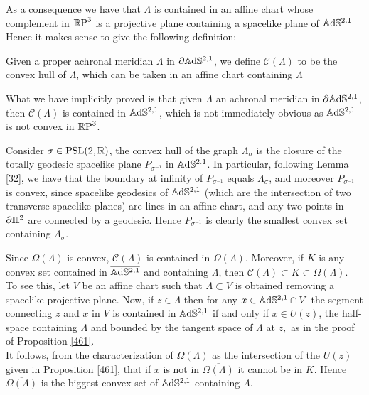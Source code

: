 As a consequence we have that $\Lambda$ is contained in an affine chart whose complement in $\mathbb{R}\text{P}^3$ is a projective plane containing a spacelike plane of $\mathbb{A}\mathrm{d}\mathbb{S}^{2,1}$ Hence it makes sense to give the following definition:

\begin{definition}
    Given a proper achronal meridian $\Lambda$ in $\partial\mathbb{A}\mathrm{d}\mathbb{S}^{2,1}$, we define $\mathcal{C}(\Lambda)$ to be the convex hull of $\Lambda$, which can be taken in an affine chart containing $\Lambda$
\end{definition}

What we have implicitly proved is that given $\Lambda$ an achronal meridian in $\partial\mathbb{A}\mathrm{d}\mathbb{S}^{2,1}$, then $\mathcal{C}(\Lambda)$ is contained in $\mathbb{A}\mathrm{d}\mathbb{S}^{2,1}$, which is not immediately obvious as $\mathbb{A}\mathrm{d}\mathbb{S}^{2,1}$ is not convex in $\mathbb{R}\text{P}^3$.

\begin{example}\label{43}
    Consider $\sigma\in\text{PSL}(2,\mathbb{R})$, the convex hull of the graph $\Lambda_\sigma$ is the closure of the totally geodesic spacelike plane $P_{\sigma^{-1}}$ in $\mathbb{A}\mathrm{d}\mathbb{S}^{2.1}$. In particular, following Lemma \ref{32}, we have that the boundary at infinity of $P_{\sigma^{-1}}$ equals $\Lambda_\sigma$, and moreover $P_{\sigma^{-1}}$ is convex, since spacelike geodesics of $\mathbb{A}\mathrm{d}\mathbb{S}^{2,1}$ (which are the intersection of two transverse spacelike planes) are lines in an affine chart, and any two points in $\partial\mathbb{H}^2$ are connected by a geodesic. Hence $P_{\sigma^{-1}}$ is clearly the smallest convex set containing $\Lambda_\sigma$.  
\end{example}

\begin{observation}\label{436} Since $\Omega(\Lambda)$ is convex, $\mathcal{C}(\Lambda)$ is contained in $\Omega(\Lambda)$. Moreover, if $K$ is any convex set contained in $\overline{\mathbb{A}\mathrm{d}\mathbb{S}^{2,1}}$ and containing $\Lambda$, then $\mathcal{C}(\Lambda)\subset K\subset \overline{\Omega(\Lambda)}.$\\
    To see this, let $V$ be an affine chart such that $\Lambda\subset V$ is obtained removing a spacelike projective plane. Now, if $z\in \Lambda$ then for any $x\in\mathbb{A}\mathrm{d}\mathbb{S}^{2,1}\cap V$ the segment connecting $z$ and $x$ in $V$ is contained in $\mathbb{A}\mathrm{d}\mathbb{S}^{2,1}$ if and only if $x\in U(z)$, the half-space containing $\Lambda$ and bounded by the tangent space of $\Lambda$ at $z,$ as in the proof of Proposition \ref{461}. \\
    It follows, from the characterization of $\Omega(\Lambda)$ as the intersection of the $U(z)$ given in Proposition \ref{461}, that if $x$ is not in $\overline{\Omega(\Lambda)}$ it cannot be in $K$. Hence $\overline{\Omega(\Lambda)}$ is the biggest convex set of $\mathbb{A}\mathrm{d}\mathbb{S}^{2,1}$ containing $\Lambda$.
\end{observation}

